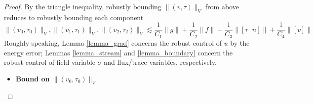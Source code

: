 \documentclass[11pt,onecolumn]{scrartcl}
\newcommand{\grad}{\nabla}
\renewcommand{\div}{\grad \cdot}
\begin{document}
\begin{proof}
By the triangle inequality, robustly bounding $\|\left(v,\tau\right)\|_V$ from above reduces to robustly bounding each component 
\[
\|\left(v_{0},\tau_{0}\right)\|_V, \|\left(v_{1},\tau_{1}\right)\|_V, \|\left(v_{2},\tau_{2}\right)\|_V \lesssim \frac{1}{C_1}\|g\| + \frac{1}{C_2}\|f\| + \frac{1}{C_3}\|[\tau\cdot n]\| + \frac{1}{C_4}\|[v]\|
\]
Roughly speaking, Lemma \ref{lemma_grad} concerns the robust control of $u$ by the energy error; Lemmas \ref{lemma_stream} and \ref{lemma_boundary} concern the robust control of field variable $\sigma$ and flux/trace variables, respectively.  

\begin{itemize}
\item \textbf{Bound on $\|\left(v_{0},\tau_{0}\right)\|_V$}
 

\end{itemize}
\end{proof}
\end{document}
